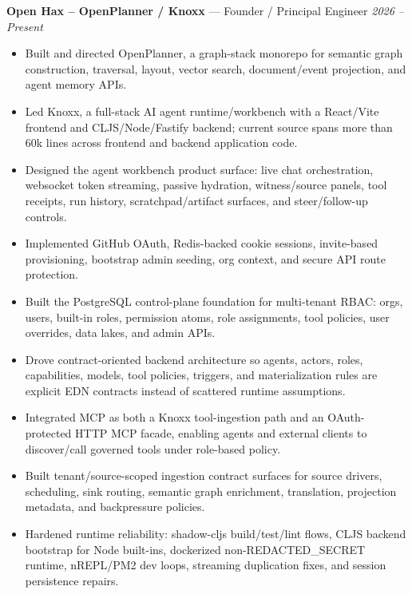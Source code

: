 \documentclass[10pt]{article}
\begin{document}
\textbf{Open Hax -- OpenPlanner / Knoxx} --- Founder / Principal Engineer \hfill \textit{2026 -- Present}\\
\vspace{-7pt}
\begin{itemize}
  \setlength\itemsep{-3pt}
  \setlength\parskip{0pt}
  \setlength\parsep{0pt}
  \item Built and directed OpenPlanner, a graph-stack monorepo for semantic graph construction, traversal, layout, vector search, document/event projection, and agent memory APIs.
  \item Led Knoxx, a full-stack AI agent runtime/workbench with a React/Vite frontend and CLJS/Node/Fastify backend; current source spans more than 60k lines across frontend and backend application code.
  \item Designed the agent workbench product surface: live chat orchestration, websocket token streaming, passive hydration, witness/source panels, tool receipts, run history, scratchpad/artifact surfaces, and steer/follow-up controls.
  \item Implemented GitHub OAuth, Redis-backed cookie sessions, invite-based provisioning, bootstrap admin seeding, org context, and secure API route protection.
  \item Built the PostgreSQL control-plane foundation for multi-tenant RBAC: orgs, users, built-in roles, permission atoms, role assignments, tool policies, user overrides, data lakes, and admin APIs.
  \item Drove contract-oriented backend architecture so agents, actors, roles, capabilities, models, tool policies, triggers, and materialization rules are explicit EDN contracts instead of scattered runtime assumptions.
  \item Integrated MCP as both a Knoxx tool-ingestion path and an OAuth-protected HTTP MCP facade, enabling agents and external clients to discover/call governed tools under role-based policy.
  \item Built tenant/source-scoped ingestion contract surfaces for source drivers, scheduling, sink routing, semantic graph enrichment, translation, projection metadata, and backpressure policies.
  \item Hardened runtime reliability: shadow-cljs build/test/lint flows, CLJS backend bootstrap for Node built-ins, dockerized non-REDACTED_SECRET runtime, nREPL/PM2 dev loops, streaming duplication fixes, and session persistence repairs.
\end{itemize}
\end{document}
